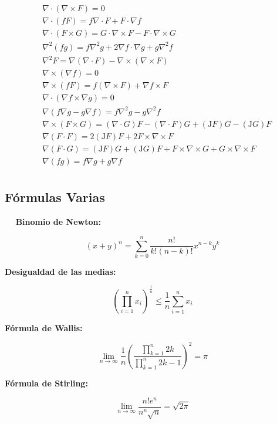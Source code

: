 \begin{minipage}{0.55\textwidth}
\begin{equation}
\begin{split}
    &\nabla\cdot(\nabla\times F) = 0\\
    &\nabla\cdot(fF) = f\nabla\cdot F+F\cdot\nabla f\\
    &\nabla\cdot(F\times G) = G\cdot\nabla\times F -
    F\cdot\nabla\times G\\
    &\nabla^2(fg) = f\nabla^2g + 2\nabla f\cdot \nabla g
    + g\nabla^2f\\
    &\nabla^2F=\nabla(\nabla\cdot F)-\nabla\times(\nabla\times F)\\
    &\nabla\times(\nabla f) = 0\\
    &\nabla\times(fF) = f(\nabla\times F)+\nabla f\times F\\\
    &\nabla\cdot(\nabla f\times\nabla g) = 0\\
    &\nabla(f\nabla g- g\nabla f) = f\nabla^2g- g\nabla^2f\\
    &\nabla\times (F\times G) = (\nabla\cdot G)F-
    (\nabla\cdot F)G+(\mathrm{J}F)G-(\mathrm{J}G)F\\
    &\nabla(F\cdot F)=2(\mathrm{J}F)F+2F\times\nabla\times F\\
    &\nabla(F\cdot G)=(\mathrm{J}F)G+(\mathrm{J}G)F
    +F\times\nabla\times G + G\times\nabla\times F\\
    &\nabla (fg) = f\nabla g  + g\nabla f\\
\end{split}
\nonumber
\end{equation}
\end{minipage}

\subsection{Fórmulas Varias}
$\,\,\,\,\,\,$\medbreak
\textbf{Binomio de Newton:}

\[(x+y)^n = \sum^n_{k=0}\frac{n!}{k!(n-k)!}x^{n-k}y^k\]

\bigbreak
\textbf{Desigualdad de las medias:}

\[\left(\prod^n_{i=1}x_i\right)^{\frac{1}{n}}
\leq \frac{1}{n}\sum^n_{i=1}x_i\]

\bigbreak
\textbf{Fórmula de Wallis:}

\[\lim_{n\to\infty}\frac{1}{n}
\left(\frac{\prod^n_{k=1}2k}
{\prod^n_{k=1}2k-1}\right)^2 = \pi\]

\bigbreak
\textbf{Fórmula de Stirling:}

\[\lim_{n\to\infty}\frac{n!e^n}{n^n\sqrt{n}}=\sqrt{2\pi}\]


\newpage